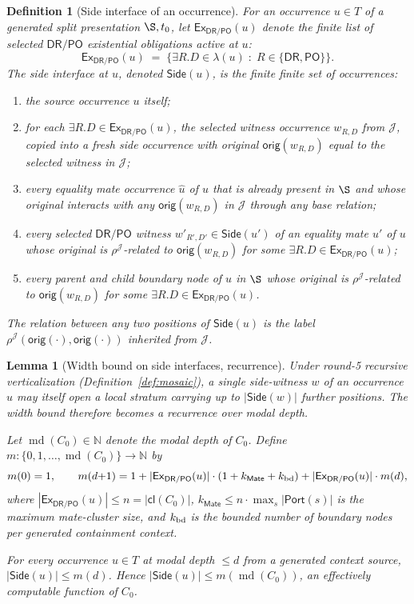 \documentclass[11pt]{article}
\newtheorem{lemma}[theorem]{Lemma}
\newtheorem{definition}[theorem]{Definition}
\newcommand{\DR}{\mathsf{DR}}
\newcommand{\PO}{\mathsf{PO}}
\newcommand{\Cl}{\mathsf{cl}}
\newcommand{\Ex}{\mathsf{Ex}}
\newcommand{\J}{\mathcal J}
\newcommand{\orig}{\mathsf{orig}}
\newcommand{\Port}{\mathsf{Port}}
\newcommand{\Mate}{\mathsf{Mate}}
\newcommand{\Side}{\mathsf{Side}}
\newcommand{\md}{\operatorname{md}}
\begin{document}
\begin{definition}[Side interface of an occurrence]\label{def:side-interface}
For an occurrence $u\in T$ of a generated split presentation
$\S,t_0$, let $\Ex_{\DR/\PO}(u)$ denote the finite list of
selected $\DR/\PO$ existential obligations active at $u$:
\[
  \Ex_{\DR/\PO}(u)\;=\;\{\exists R.D\in\lambda(u)\;:\;R\in\{\DR,\PO\}\}.
\]
The \emph{side interface at $u$}, denoted $\Side(u)$, is the
finite finite set of occurrences:
\begin{enumerate}[label=(\arabic*)]
\item the source occurrence $u$ itself;
\item for each $\exists R.D\in\Ex_{\DR/\PO}(u)$, the selected
witness occurrence $w_{R,D}$ from $\J$, copied into a fresh side
occurrence with original $\orig(w_{R,D})$ equal to the selected
witness in $\J$;
\item every equality mate occurrence $\widehat u$ of $u$ that is
already present in $\S$ and whose original interacts with any
$\orig(w_{R,D})$ in $\J$ through any base relation;
\item every selected $\DR/\PO$ witness $w'_{R',D'}\in\Side(u')$ of
an equality mate $u'$ of $u$ whose original is $\rho^\J$-related to
$\orig(w_{R,D})$ for some $\exists R.D\in\Ex_{\DR/\PO}(u)$;
\item every parent and child boundary node of $u$ in $\S$ whose
original is $\rho^\J$-related to $\orig(w_{R,D})$ for some
$\exists R.D\in\Ex_{\DR/\PO}(u)$.
\end{enumerate}
The relation between any two positions of $\Side(u)$ is the label
$\rho^\J(\orig(\cdot),\orig(\cdot))$ inherited from $\J$.
\end{definition}

\begin{lemma}[Width bound on side interfaces, recurrence]\label{lem:side-width}
Under round-5 recursive verticalization (Definition~\ref{def:mosaic}),
a single side-witness $w$ of an occurrence $u$ may itself open a
local stratum carrying up to $|\Side(w)|$ further positions.  The
width bound therefore becomes a recurrence over modal depth.

Let $\md(C_0)\in\mathbb N$ denote the modal depth of $C_0$.  Define
$m:\{0,1,\dots,\md(C_0)\}\to\mathbb N$ by
\[
  m(0)=1,\qquad
  m(d{+}1)=1+|\Ex_{\DR/\PO}(u)|\cdot(1+k_{\Mate}+k_{\rm bd})+|\Ex_{\DR/\PO}(u)|\cdot m(d),
\]
where $|\Ex_{\DR/\PO}(u)|\le n=|\Cl(C_0)|$, $k_{\Mate}\le n\cdot
\max_s|\Port(s)|$ is the maximum mate-cluster size, and $k_{\rm bd}$
is the bounded number of boundary nodes per generated containment
context.

For every occurrence $u\in T$ at modal depth $\le d$ from a
generated context source, $|\Side(u)|\le m(d)$.  Hence
$|\Side(u)|\le m(\md(C_0))$, an effectively computable function of
$C_0$.
\end{lemma}
\end{document}

